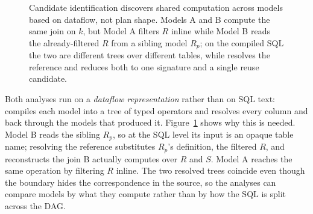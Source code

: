 \begin{figure}[tb]
\centering
{}
\caption{
Candidate identification discovers shared computation across models based on dataflow, not plan shape.
Models A and B compute the same join on $k$, but Model A filters $R$ inline while Model B reads the already-filtered $R$ from a sibling model $R_p$; on the compiled SQL the two are different trees over different tables, while \dagsmith{} resolves the reference and reduces both to one signature and a single reuse candidate.}
\label{dag:fig:dataflow-grouping}
\inv
\end{figure}

Both analyses run on a \emph{dataflow representation} rather than on SQL text: \dagsmith{} compiles each model into a tree of typed operators and resolves every column and  back through the models that produced it. Figure~\ref{dag:fig:dataflow-grouping} shows why this is needed. Model B reads the sibling $R_p$, so at the SQL level its input is an opaque table name; resolving the reference substitutes $R_p$'s definition, the filtered $R$, and reconstructs the join B actually computes over $R$ and $S$. Model A reaches the same operation by filtering $R$ inline.
The two resolved trees coincide even though the  boundary hides the correspondence in the source, so the analyses can compare models by what they compute rather than by how the SQL is split across the DAG.

